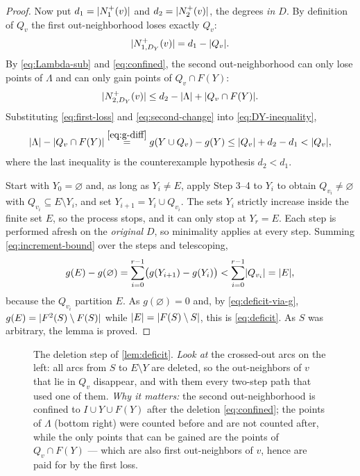 \begin{proof}
Now put $d_1=\lvert N_1^+(v)\rvert$ and $d_2=\lvert N_2^+(v)\rvert$, the degrees \emph{in $D$}. By definition of
$Q_v$ the first out-neighborhood loses exactly $Q_v$:
\begin{equation}\label{eq:first-loss}
 \lvert N_{1,D_Y}^+(v)\rvert=d_1-\lvert Q_v\rvert.
\end{equation}
By \eqref{eq:Lambda-sub} and \eqref{eq:confined}, the second out-neighborhood can only lose points
of $\Lambda$ and can only gain points of $Q_v\cap F(Y)$:
\begin{equation}\label{eq:second-change}
 \lvert N_{2,D_Y}^+(v)\rvert\le d_2-\lvert \Lambda\rvert+\lvert Q_v\cap F(Y)\rvert.
\end{equation}
Substituting \eqref{eq:first-loss} and \eqref{eq:second-change} into \eqref{eq:DY-inequality},
\begin{equation}\label{eq:increment-bound}
 \lvert \Lambda\rvert-\lvert Q_v\cap F(Y)\rvert
 \overset{\eqref{eq:g-diff}}{=}g(Y\cup Q_v)-g(Y)
 \le \lvert Q_v\rvert+d_2-d_1<\lvert Q_v\rvert,
\end{equation}
where the last inequality is the counterexample hypothesis $d_2<d_1$.

Start with $Y_0=\varnothing$ and, as long as $Y_i\ne E$, apply Step 3--4 to $Y_i$ to obtain
$Q_{v_i}\ne\varnothing$ with $Q_{v_i}\subseteq E\setminus Y_i$, and set $Y_{i+1}=Y_i\cup Q_{v_i}$.
The sets $Y_i$ strictly increase inside the finite set $E$, so the process stops, and it can only
stop at $Y_r=E$. Each step is performed afresh on the \emph{original} $D$, so minimality applies at
every step. Summing \eqref{eq:increment-bound} over the steps and telescoping,
\[
 g(E)-g(\varnothing)=\sum_{i=0}^{r-1}\bigl(g(Y_{i+1})-g(Y_i)\bigr)<\sum_{i=0}^{r-1}\lvert Q_{v_i}\rvert
 =\lvert E\rvert,
\]
because the $Q_{v_i}$ partition $E$. As $g(\varnothing)=0$ and, by \eqref{eq:deficit-via-g},
$g(E)=\lvert F^2(S)\setminus F(S)\rvert$ while $\lvert E\rvert=\lvert F(S)\setminus S\rvert$, this is
\eqref{eq:deficit}. As $S$ was arbitrary, the lemma is proved.
\end{proof}

\begin{figure}[t]
\centering

\caption{The deletion step of \cref{lem:deficit}. \emph{Look at} the crossed-out arcs on the left:
 all arcs from $S$ to $E\setminus Y$ are deleted, so the out-neighbors of $v$ that lie in $Q_v$
 disappear, and with them every two-step path that used one of them. \emph{Why it matters:} the
 second out-neighborhood is confined to $I\cup Y\cup F(Y)$ after the deletion
 \eqref{eq:confined}; the points of $\Lambda$ (bottom right) were counted before and are not
 counted after, while the only points that can be gained are the points of $Q_v\cap F(Y)$ ---
 which are also first out-neighbors of $v$, hence are paid for by the first loss.}
\label{fig:deletion}
\end{figure}

